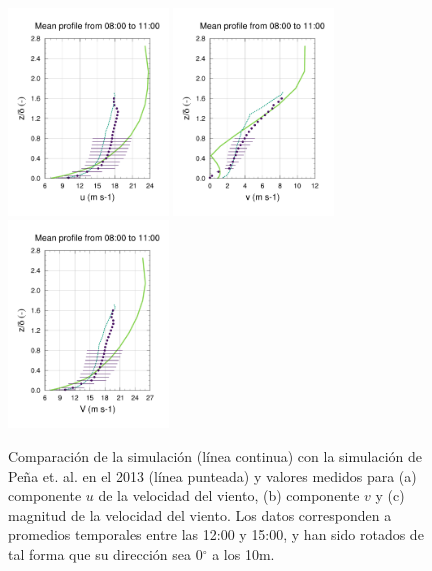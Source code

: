 \begin{figure}[H]
	\centering
		\includegraphics[height=5.5cm,page=37,trim={10mm 15mm 20mm 35mm},clip]{Imagenes/06/hov/9u}%
		\includegraphics[height=5.5cm,page=37,trim={44mm 15mm 20mm 35mm},clip]{Imagenes/06/hov/9v}%
		\includegraphics[height=5.5cm,page=37,trim={44mm 15mm -20mm 35mm},clip]{Imagenes/06/hov/9vv}%

	\caption{Comparación de la simulación (línea continua) con la simulación de Peña et. al. en el 2013 (línea punteada) y valores medidos para (a) componente $u$ de la velocidad del viento, (b) componente $v$ y (c) magnitud de la velocidad del viento. Los datos corresponden a promedios temporales entre las 12:00 y 15:00, y han sido rotados de tal forma que su dirección sea 0$^\circ$ a los 10m.}
	\label{fig:06_hov_pena}
\end{figure}

